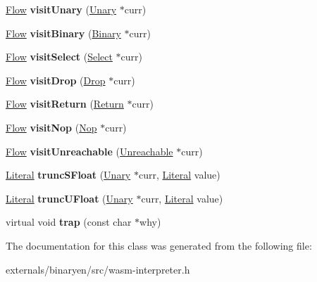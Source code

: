 \begin{DoxyCompactItemize}
\mbox{\hyperlink{classwasm_1_1_flow}{Flow}} {\bfseries visit\+Unary} (\mbox{\hyperlink{classwasm_1_1_unary}{Unary}} $\ast$curr)
\item 
\mbox{\label{classwasm_1_1_expression_runner_adafe6666f7db48f50e4183c106f8fb37}} 
\mbox{\hyperlink{classwasm_1_1_flow}{Flow}} {\bfseries visit\+Binary} (\mbox{\hyperlink{classwasm_1_1_binary}{Binary}} $\ast$curr)
\item 
\mbox{\label{classwasm_1_1_expression_runner_a345eaf85a25b7ddf7c084f444a7d2915}} 
\mbox{\hyperlink{classwasm_1_1_flow}{Flow}} {\bfseries visit\+Select} (\mbox{\hyperlink{classwasm_1_1_select}{Select}} $\ast$curr)
\item 
\mbox{\label{classwasm_1_1_expression_runner_a2aadb217cb1738ead356c907bfab98b0}} 
\mbox{\hyperlink{classwasm_1_1_flow}{Flow}} {\bfseries visit\+Drop} (\mbox{\hyperlink{classwasm_1_1_drop}{Drop}} $\ast$curr)
\item 
\mbox{\label{classwasm_1_1_expression_runner_ab91a7e1db1b544a2293825dbc7e24947}} 
\mbox{\hyperlink{classwasm_1_1_flow}{Flow}} {\bfseries visit\+Return} (\mbox{\hyperlink{classwasm_1_1_return}{Return}} $\ast$curr)
\item 
\mbox{\label{classwasm_1_1_expression_runner_a7c61ad6fc6b84907b36375e01568708b}} 
\mbox{\hyperlink{classwasm_1_1_flow}{Flow}} {\bfseries visit\+Nop} (\mbox{\hyperlink{classwasm_1_1_nop}{Nop}} $\ast$curr)
\item 
\mbox{\label{classwasm_1_1_expression_runner_a1f9a41310c2a742ec1fb588f98cc2c0e}} 
\mbox{\hyperlink{classwasm_1_1_flow}{Flow}} {\bfseries visit\+Unreachable} (\mbox{\hyperlink{classwasm_1_1_unreachable}{Unreachable}} $\ast$curr)
\item 
\mbox{\label{classwasm_1_1_expression_runner_a7a315f5058e091e296df0ec76a742a91}} 
\mbox{\hyperlink{classwasm_1_1_literal}{Literal}} {\bfseries trunc\+S\+Float} (\mbox{\hyperlink{classwasm_1_1_unary}{Unary}} $\ast$curr, \mbox{\hyperlink{classwasm_1_1_literal}{Literal}} value)
\item 
\mbox{\label{classwasm_1_1_expression_runner_a37e5e20b4f57ec17a2bfa302e2788fca}} 
\mbox{\hyperlink{classwasm_1_1_literal}{Literal}} {\bfseries trunc\+U\+Float} (\mbox{\hyperlink{classwasm_1_1_unary}{Unary}} $\ast$curr, \mbox{\hyperlink{classwasm_1_1_literal}{Literal}} value)
\item 
\mbox{\label{classwasm_1_1_expression_runner_aebcaa9fb3b6588f783ea7e73be681741}} 
virtual void {\bfseries trap} (const char $\ast$why)
\end{DoxyCompactItemize}


The documentation for this class was generated from the following file\+:\begin{DoxyCompactItemize}
\item 
externals/binaryen/src/wasm-\/interpreter.\+h\end{DoxyCompactItemize}
